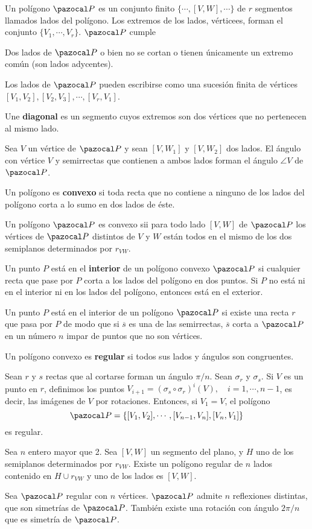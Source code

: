  Un polígono $\PP$ es un conjunto finito
$\{\cdots, [V,W],\cdots \}$ de $r$ segmentos llamados lados del polígono. Los extremos de los lados, vérticees, forman el conjunto $\{V_1,\cdots,V_r \}$. $\PP$ cumple
\begin{itemizex}
	\item Dos lados de $\PP$ o bien no se cortan o tienen únicamente un extremo común (son lados adycentes).
	\item Los lados de $\PP$ pueden escribirse como una sucesión finita de vértices $[V_1,V_2],[V_2,V_3],\cdots,[V_r,V_1]$.
\end{itemizex}

 Une \textbf{diagonal} es un segmento cuyos extremos son dos vértices que no pertenecen al mismo lado.

 Sea $V$ un vértice de $\PP$ y sean $[V,W_1]$ y $[V,W_2]$ dos lados. El ángulo con vértice $V$ y semirrectas que contienen a ambos lados forman el ángulo $\angle V$ de $\PP$.

 Un polígono es \textbf{convexo} si toda recta que no contiene a ninguno de los lados del polígono corta a lo sumo en dos lados de éste.

  Un polígono $\PP$ es convexo sii para todo lado $[V,W]$ de $\PP$ los vértices de $\PP$ distintos de $V$ y $W$ están todos en el mismo de los dos semiplanos determinados por $r_{VW}$.
 
  Un punto $P$ está en el \textbf{interior} de un polígono convexo $\PP$ si cualquier recta que pase por $P$ corta a los lados del polígono en dos puntos. Si $P$ no está ni en el interior ni en los lados del polígono, entonces está en el exterior. 
 
  Un punto $P$ está en el interior de un polígono $\PP$ si existe una recta $r$ que pasa por $P$ de modo que si $\overline{s}$ es una de las semirrectas, $\overline{s}$ corta a $\PP$ en un número $n$ impar de puntos que no son vértices.
 
  Un polígono convexo es \textbf{regular} si todos sus lados y ángulos son congruentes.
 
  Sean $r$ y $s$ rectas que al cortarse forman un ángulo $\pi/n$. Sean $\sigma_r$ y $\sigma_s$. Si $V$ es un punto en $r$, definimos los puntos $V_{i+1} = (\sigma_s \circ \sigma_r)^i(V), \quad i=1,\cdots, n-1$, es decir, las imágenes de $V$ por rotaciones. Entonces, si $V_1 = V$, el polígono
 $$\PP= \{[V_1,V_2],\cdots,[V_{n-1},V_n],[V_n,V_1]  \}$$
 es regular.
 
  Sea $n$ entero mayor que 2. Sea $[V,W]$ un segmento del plano, y $H$ uno de los semiplanos determinados por $r_{VW}$. Existe un polígono regular de $n$ lados contenido en $H \cup r_{VW}$ y uno de los lados es $[V,W]$.
 
  Sea $\PP$ regular con $n$ vértices. $\PP$ admite $n$ reflexiones distintas, que son simetrías de $\PP$. También existe una rotación con ángulo $2\pi/n$ que es simetría de $\PP$.
 



 

